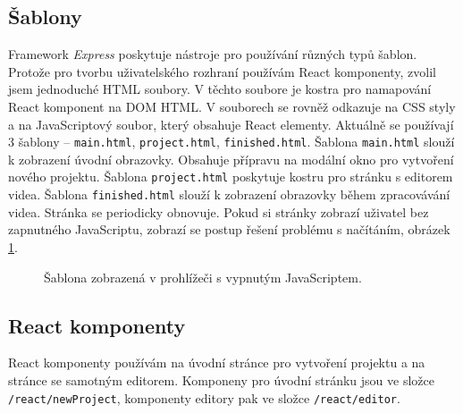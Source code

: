 \subsection{Šablony}
Framework \textit{Express} poskytuje nástroje pro používání různých typů šablon. Protože pro tvorbu uživatelského rozhraní používám React komponenty, zvolil jsem jednoduché HTML soubory. V těchto soubore je kostra pro namapování React komponent na DOM HTML. V souborech se rovněž odkazuje na CSS styly a na JavaScriptový soubor, který obsahuje React elementy. Aktuálně se používají 3 šablony -- \texttt{main.html}, \texttt{project.html}, \texttt{finished.html}. Šablona \texttt{main.html} slouží k zobrazení úvodní obrazovky. Obsahuje přípravu na modální okno pro vytvoření nového projektu. Šablona \texttt{project.html} poskytuje kostru pro stránku s editorem videa. Šablona \texttt{finished.html} slouží k zobrazení obrazovky během zpracovávání videa. Stránka se periodicky obnovuje. Pokud si stránky zobrazí uživatel bez zapnutného JavaScriptu, zobrazí se postup řešení problému s načítáním, obrázek \ref{img:loading-page}.
\begin{figure}[h]
	\centering
	\caption{Šablona zobrazená v prohlížeči s vypnutým JavaScriptem.}\label{img:loading-page}
\end{figure}

\subsection{React komponenty}
React komponenty používám na úvodní stránce pro vytvoření projektu a na stránce se samotným editorem. Komponeny pro úvodní stránku jsou ve složce \texttt{/react/newProject}, komponenty editory pak ve složce \texttt{/react/editor}.

